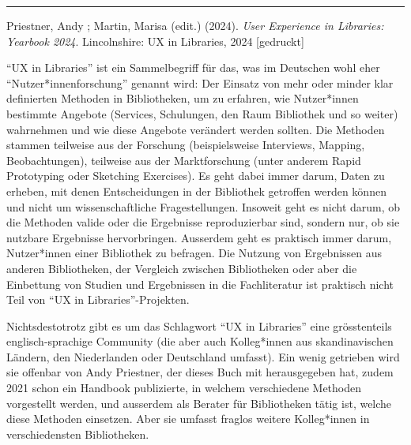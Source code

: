 \documentclass[a4paper,
fontsize=11pt,
oneside,
numbers=noperiodatend,
parskip=half-,
bibliography=totoc,
final
]{scrartcl}
\begin{document}
\begin{center}\rule{0.5\linewidth}{0.5pt}\end{center}

Priestner, Andy ; Martin, Marisa (edit.) (2024). \emph{User Experience
in Libraries: Yearbook 2024}. Lincolnshire: UX in Libraries, 2024
{[}gedruckt{]}

``UX in Libraries'' ist ein Sammelbegriff für das, was im Deutschen wohl
eher ``Nutzer*innenforschung'' genannt wird: Der Einsatz von mehr oder
minder klar definierten Methoden in Bibliotheken, um zu erfahren, wie
Nutzer*innen bestimmte Angebote (Services, Schulungen, den Raum
Bibliothek und so weiter) wahrnehmen und wie diese Angebote verändert
werden sollten. Die Methoden stammen teilweise aus der Forschung
(beispielsweise Interviews, Mapping, Beobachtungen), teilweise aus der
Marktforschung (unter anderem Rapid Prototyping oder Sketching
Exercises). Es geht dabei immer darum, Daten zu erheben, mit denen
Entscheidungen in der Bibliothek getroffen werden können und nicht um
wissenschaftliche Fragestellungen. Insoweit geht es nicht darum, ob die
Methoden valide oder die Ergebnisse reproduzierbar sind, sondern nur, ob
sie nutzbare Ergebnisse hervorbringen. Ausserdem geht es praktisch immer
darum, Nutzer*innen einer Bibliothek zu befragen. Die Nutzung von
Ergebnissen aus anderen Bibliotheken, der Vergleich zwischen
Bibliotheken oder aber die Einbettung von Studien und Ergebnissen in die
Fachliteratur ist praktisch nicht Teil von ``UX in
Libraries''-Projekten.

Nichtsdestotrotz gibt es um das Schlagwort ``UX in Libraries'' eine
grösstenteils englisch-sprachige Community (die aber auch Kolleg*innen
aus skandinavischen Ländern, den Niederlanden oder Deutschland umfasst).
Ein wenig getrieben wird sie offenbar von Andy Priestner, der dieses
Buch mit herausgegeben hat, zudem 2021 schon ein Handbook publizierte,
in welchem verschiedene Methoden vorgestellt werden, und ausserdem als
Berater für Bibliotheken tätig ist, welche diese Methoden einsetzen.
Aber sie umfasst fraglos weitere Kolleg*innen in verschiedensten
Bibliotheken.
\end{document}
